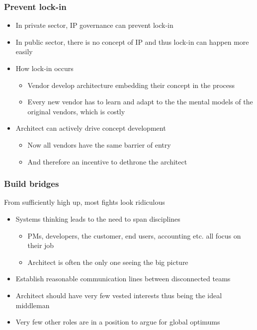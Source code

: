 \documentclass[10pt, compress]{beamer}
\begin{document}
\begin{frame}[fragile]
	\frametitle{Prevent lock-in}

	\begin{itemize}
		\item In private sector, IP governance can prevent lock-in
		\item In public sector, there is no concept of IP and thus lock-in can happen more easily
		\item How lock-in occurs
		\begin{itemize}
			\item Vendor develop architecture embedding their concept in the process
			\item Every new vendor has to learn and adapt to the the mental models of the original vendors, which is costly
		\end{itemize}
		\item Architect can actively drive concept development
		\begin{itemize}
			\item Now all vendors have the same barrier of entry
			\item And therefore an incentive to dethrone the architect
		\end{itemize}
	\end{itemize}
\end{frame}

\begin{frame}[fragile]
	\frametitle{Build bridges}

	From sufficiently high up, most fights look ridiculous
	
	\begin{itemize}
		\item Systems thinking leads to the need to span disciplines
		\begin{itemize}
			\item PMs, developers, the customer, end users, accounting etc. all focus on their job
			\item Architect is often the only one seeing the big picture 
		\end{itemize}
		\item Establish reasonable communication lines between disconnected teams \citep{fowlerlean}
		\item Architect should have very few vested interests thus being the ideal middleman
		\item Very few other roles are in a position to argue for global optimums
	\end{itemize}
\end{frame}
\end{document}
